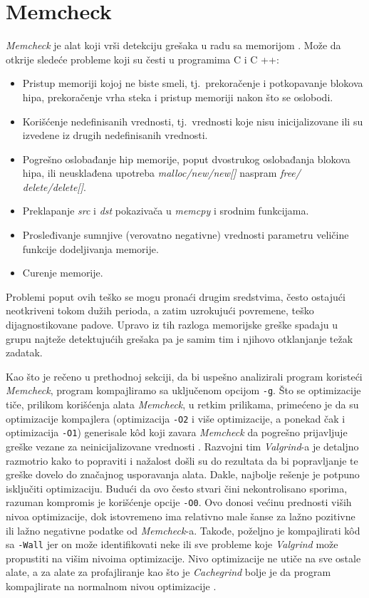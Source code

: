 \documentclass[12pt,oneside]{memoir}
\theoremstyle{plain}
\theoremstyle{definition}
\begin{document}
\section{Memcheck}
\textit{Memcheck} je alat koji vrši detekciju grešaka u radu sa memorijom \cite{Memcheck}. Može da otkrije sledeće probleme koji su česti u programima C i C ++:
\begin{itemize}
\item Pristup memoriji kojoj ne biste smeli, tj.~prekoračenje i potkopavanje blokova hipa, prekoračenje vrha steka i pristup memoriji nakon što se oslobodi.
\item Korišćenje nedefinisanih vrednosti, tj.~vrednosti koje nisu inicijalizovane ili su izvedene iz drugih nedefinisanih vrednosti.
\item Pogrešno oslobađanje hip memorije, poput dvostrukog oslobađanja blokova hipa, ili neusklađena upotreba \textit{malloc/new/new[]} naspram \textit{free/ delete/delete[]}.
\item Preklapanje \textit{src} i \textit{dst} pokazivača u \textit{memcpy} i srodnim funkcijama.
\item Prosleđivanje sumnjive (verovatno negativne) vrednosti parametru veličine funkcije dodeljivanja memorije.
\item Curenje memorije.
\end{itemize}

Problemi poput ovih teško se mogu pronaći drugim sredstvima, često ostajući neotkriveni tokom dužih perioda, a zatim uzrokujući povremene, teško dijagnostikovane padove. Upravo iz tih razloga memorijske greške spadaju u grupu najteže detektujućih grešaka pa je samim tim i njihovo otklanjanje težak zadatak.

Kao što je rečeno u prethodnoj sekciji, da bi uspešno analizirali program koristeći \textit{Memcheck}, program kompajliramo sa uključenom opcijom \texttt{-g}. Što se optimizacije tiče, prilikom korišćenja alata \textit{Memcheck}, u retkim prilikama, primećeno je da su optimizacije kompajlera (optimizacija \texttt{-O2} i više optimizacije, a ponekad čak i optimizacija \texttt{-O1}) generisale k\^od koji zavara \textit{Memcheck} da pogrešno prijavljuje greške vezane za neinicijalizovane vrednosti \cite{ValgrindCore}. Razvojni tim \textit{Valgrind}-a je detaljno razmotrio kako to popraviti i nažalost došli su do rezultata da bi popravljanje te greške dovelo do značajnog usporavanja alata. Dakle, najbolje rešenje je potpuno isključiti optimizaciju. Budući da ovo često stvari čini nekontrolisano sporima, razuman kompromis je korišćenje opcije \texttt{-O0}. Ovo donosi većinu prednosti viših nivoa optimizacije, dok istovremeno ima relativno male šanse za lažno pozitivne ili lažno negativne podatke od \textit{Memcheck}-a. Takođe, poželjno je kompajlirati k\^od sa \texttt{-Wall} jer on može identifikovati neke ili sve probleme koje \textit{Valgrind} može propustiti na višim nivoima optimizacije. Nivo optimizacije ne utiče na sve ostale alate, a za alate za profajliranje kao što je \textit{Cachegrind} bolje je da program kompajlirate na normalnom nivou optimizacije \cite{ValgrindCore}. 
\end{document}
